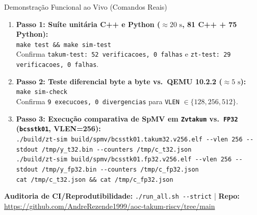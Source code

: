 \documentclass[aspectratio=169,10pt]{beamer}
\begin{document}
\begin{frame}{Demonstração Funcional ao Vivo (Comandos Reais)}
	\small
	\begin{enumerate}
		\item \textbf{Passo 1: Suíte unitária C++ e Python ($\approx 20\text{ s}$, 81 C++ + 75 Python):}\\
		      \texttt{make test \&\& make sim-test}\\
		      {\footnotesize Confirma \texttt{takum-test: 52 verificacoes, 0 falhas} e \texttt{zt-test: 29 verificacoes, 0 falhas}.}
		\item \textbf{Passo 2: Teste diferencial byte a byte vs.\ QEMU 10.2.2 ($\approx 5\text{ s}$):}\\
		      \texttt{make sim-check}\\
		      {\footnotesize Confirma \texttt{9 execucoes, 0 divergencias} para \texttt{VLEN} $\in \{128, 256, 512\}$.}
		\item \textbf{Passo 3: Execução comparativa de SpMV em \texttt{Zvtakum} vs.\ \texttt{FP32} (\texttt{bcsstk01}, VLEN=256):}\\
		      \texttt{./build/zt-sim build/spmv/bcsstk01.takum32.v256.elf -{}-vlen 256 -{}-stdout /tmp/y\_t32.bin -{}-counters /tmp/c\_t32.json}\\
		      \texttt{./build/zt-sim build/spmv/bcsstk01.fp32.v256.elf -{}-vlen 256 -{}-stdout /tmp/y\_fp32.bin -{}-counters /tmp/c\_fp32.json}\\
		      \texttt{cat /tmp/c\_t32.json \&\& cat /tmp/c\_fp32.json}
	\end{enumerate}
	\vspace{3pt}
	{\footnotesize \textbf{Auditoria de CI/Reprodutibilidade:} \texttt{./run\_all.sh -{}-strict} \quad | \quad \textbf{Repo:} \url{https://github.com/AndreRezende1999/aoc-takum-riscv/tree/main}}
\end{frame}
\end{document}
